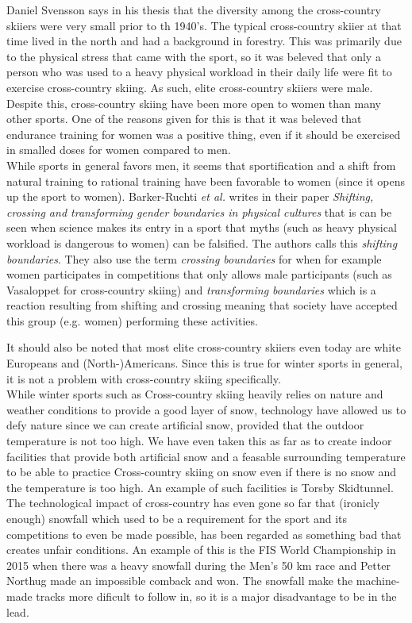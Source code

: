 \documentclass[12pt,a4paper]{IEEEtran}
\begin{document}
\noindent Daniel Svensson says in his thesis that the diversity among the cross-country skiiers were very small prior to th 1940's.
The typical cross-country skiier at that time lived in the north and had a background in forestry.
This was primarily due to the physical stress that came with the sport, so it was beleved that only a person who was used to a heavy physical workload in their daily life were fit to exercise cross-country skiing.
As such, elite cross-country skiiers were male.
Despite this, cross-country skiing have been more open to women than many other sports.
One of the reasons given for this is that it was beleved that endurance training for women was a positive thing, even if it should be exercised in smalled doses for women compared to men.\\
While sports in general favors men, it seems that sportification and a shift from natural training to rational training have been favorable to women (since it opens up the sport to women).
Barker-Ruchti \textit{et al.} writes in their paper \textit{Shifting, crossing and transforming gender boundaries in physical cultures} that is can be seen when science makes its entry in a sport that myths (such as heavy physical workload is dangerous to women) can be falsified.
The authors calls this \textit{shifting boundaries}.
They also use the term \textit{crossing boundaries} for when for example women participates in competitions that only allows male participants (such as Vasaloppet for cross-country skiing) and \textit{transforming boundaries} which is a reaction resulting from shifting and crossing meaning that society have accepted this group (e.g. women) performing these activities.

It should also be noted that most elite cross-country skiiers even today are white Europeans and (North-)Americans.
Since this is true for winter sports in general, it is not a problem with cross-country skiing specifically.\\

\noindent While winter sports such as Cross-country skiing heavily relies on nature and weather conditions to provide a good layer of snow, technology have allowed us to defy nature since we can create artificial snow, provided that the outdoor temperature is not too high.
We have even taken this as far as to create indoor facilities that provide both artificial snow and a feasable surrounding temperature to be able to practice Cross-country skiing on snow even if there is no snow and the temperature is too high.
An example of such facilities is Torsby Skidtunnel.
The technological impact of cross-country has even gone so far that (ironicly enough) snowfall which used to be a requirement for the sport and its competitions to even be made possible, has been regarded as something bad that creates unfair conditions.
An example of this is the FIS World Championship in 2015 when there was a heavy snowfall during the Men's 50 km race and Petter Northug made an impossible comback and won.
The snowfall make the machine-made tracks more dificult to follow in, so it is a major disadvantage to be in the lead.
\end{document}
